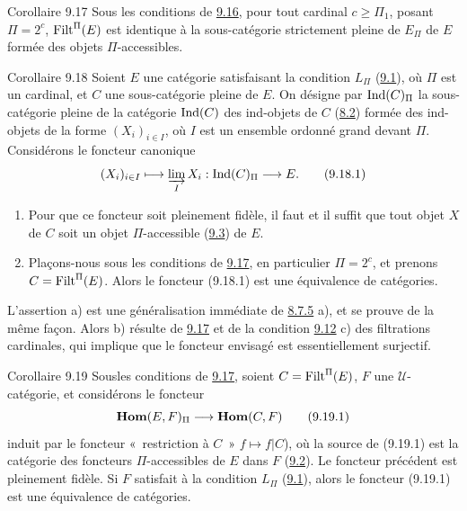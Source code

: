 \documentclass[10pt]{../fichiers-configuration-latex/smfart}
\def\labelenumi{(\theenumi)}
\begin{document}
\begin{enonce*}{Corollaire 9.17}
Sous les conditions de \hyperref[I.prop9.16]{9.16}, pour tout cardinal $c\geq
\Pi_1$, posant $\Pi=2^c$, $\operatorname{Filt}^{\Pi}(E)$ est identique à la
sous-catégorie strictement pleine de $E_{\Pi}$ de $E$ formée des
objets $\Pi$-accessibles.
\end{enonce*}

\begin{enonce*}{Corollaire 9.18}
Soient $E$ une catégorie satisfaisant la condition $L_{\Pi}$
(\hyperref[I.def9.1]{9.1}), où $\Pi$ est un cardinal, et $C$ une
sous-catégorie pleine
de $E$. On désigne par $\operatorname{Ind}(C)_{\Pi}$ la sous-catégorie pleine de
la catégorie $\operatorname{Ind}(C)$ des ind-objets de $C$ (\hyperref[I.sec8.2]{8.2})
formée des
ind-objets de la forme $(X_i)_{i\in I}$, où $I$ est un ensemble
ordonné grand devant $\Pi$. Considérons le foncteur canonique
\begin{equation}
(X_i)_{i\in I}\longmapsto \varinjlim_I
X_i:\operatorname{Ind}(C)_{\Pi}\longrightarrow E{}.\tag{9.18.1}
\end{equation}
\begin{enumerate}
\renewcommand{\theenumi}{\alph{enumi}}
\renewcommand{\labelenumi}{\theenumi)}
\item Pour que ce foncteur soit pleinement fidèle, il faut et il
suffit que tout objet $X$ de $C$ soit un objet $\Pi$-accessible
(\hyperref[I.def9.3]{9.3}) de $E$.

\item Plaçons-nous sous les conditions de \hyperref[I.cor9.17]{9.17}, en particulier
$\Pi=2^c$, et prenons $C=\operatorname{Filt}^{\Pi}(E)$. Alors le foncteur (9.18.1)
est une équivalence de catégories.
\end{enumerate}
\end{enonce*}

L'assertion a) est une généralisation immédiate de \hyperref[I.prop8.7.5]{8.7.5}
a), et se prouve de la même façon. Alors b) résulte de
\hyperref[I.cor9.17]{9.17} et de la condition \hyperref[I.def9.12]{9.12} c) des
filtrations cardinales, qui implique que le foncteur envisagé est
essentiellement surjectif.

\begin{enonce*}{Corollaire 9.19}
Sous\pageoriginale les conditions de \hyperref[I.cor9.17]{9.17}, soient
$C=\operatorname{Filt}^{\Pi}(E)$, $F$ une $𝒰$-catégorie, et considérons le
foncteur
\begin{equation}
\operatorname{\mathbf{Hom}}(E,F)_{\Pi}\longrightarrow \operatorname{\mathbf{Hom}}(C,F)\tag{9.19.1}
\end{equation}
induit par le foncteur « restriction à $C$ » $f\mapsto f| C$),
où la source de (9.19.1) est la catégorie des foncteurs
$\Pi$-accessibles de $E$ dans $F$ (\hyperref[I.def9.2]{9.2}). Le foncteur
précédent est
pleinement fidèle. Si $F$ satisfait à la condition $L_{\Pi}$
(\hyperref[I.def9.1]{9.1}), alors le foncteur (9.19.1) est une équivalence de
catégories.
\end{enonce*}
\end{document}
